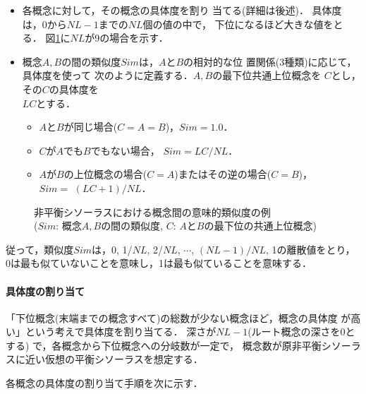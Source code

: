\begin{itemize}
 \item 各概念に対して，その概念の{\dg 具体度}を割り
     当てる(詳細は後述)．
     具体度は，0から$NL-1$までの$NL$個の値の中で，
     下位になるほど大きな値をとる．
     図\ref{fig:similarity}に$NL$が9の場合を示す．
 \item 概念$A,B$の間の類似度$Sim$は，$A$と$B$の相対的な位
       置関係(3種類)に応じて，具体度を使って
       次のように定義する．$A,B$の最下位共通上位概念を
     $C$とし，その$C$の具体度を\\$LC$とする．
\begin{itemize}
\item $A$と$B$が同じ場合($C=A=B$)，$Sim=1.0$．
\item $C$が$A$でも$B$でもない場合，
      $Sim=LC/NL$．
\item $A$が$B$の上位概念の場合($C=A$)またはその逆の場合($C=B$)，\\
      $Sim=$ $(LC+1)/NL$．
\end{itemize}
\end{itemize}

\begin{figure}[bht]
 
 \vspace*{0mm}
 \centerline{
 \vspace*{-2.5mm}
 }
 \vspace*{3mm}
 \caption[]{非平衡シソーラスにおける概念間の意味的類似度の例\\
 ($Sim$: 概念$A,B$の間の類似度, $C$: $A$と$B$の最下位の共通上位概念)}
 \label{fig:similarity}
\end{figure}

従って，類似度$Sim$は，0, 1/$NL$, 2/$NL$, $\cdots$, $(NL-1)/NL$, 
1の離散値をとり，
0は最も似ていないことを意味し，1は最も似ていることを意味する．

\paragraph{具体度の割り当て}
  「下位概念(末端までの概念すべて)の総数が少ない概念ほど，概念の具体度
  が高い」という考えで具体度を割り当てる．
   深さが$NL-1$(ルート概念の深さを0とする) 
   で，各概念から下位概念への分岐数が一定で，
   概念数が原非平衡シソーラスに近い仮想の平衡シソーラスを想定する．

   各概念の具体度の割り当て手順を次に示す．

